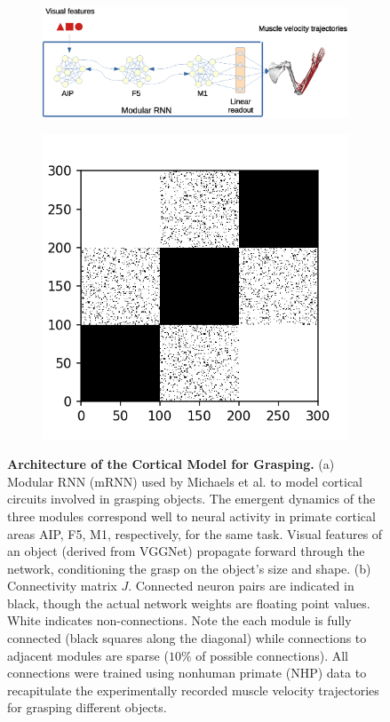 \documentclass[12pt]{iopart}
\begin{document}
\begin{figure}
	\centering
	\begin{subfigure}[c]{0.69\textwidth}
		\centering
		\includegraphics[width=\textwidth]{michaels.eps}
		\caption{}
	\end{subfigure}
	\hfill
	\begin{subfigure}[c]{0.30\textwidth}
		\centering
		\includegraphics[width=\textwidth]{mRNN_J.png}
		\caption{}
	\end{subfigure}
	\hfill
\caption{\textbf{Architecture of the Cortical Model for Grasping.} (a) Modular RNN (mRNN) used by Michaels et al.
        \cite{michaels.mrnn} to model cortical circuits involved in grasping objects.
        The emergent dynamics of the three modules correspond well to neural activity in
        primate cortical areas AIP, F5, M1, respectively, for the same task. Visual
        features of an object (derived from VGGNet) propagate forward through the
		network, conditioning the grasp on the object's size and shape. (b)
		Connectivity matrix $J$. Connected neuron pairs are indicated in black, though the
		actual network weights are floating point values. White indicates non-connections.
		Note the each module is fully connected (black squares along the diagonal) while connections to adjacent
        modules are sparse ($10\%$ of possible connections). All connections were trained using nonhuman primate
        (NHP) data to recapitulate the experimentally recorded muscle velocity trajectories for grasping different
        objects.}
\label{fig:michaels}
\end{figure}
\end{document}
